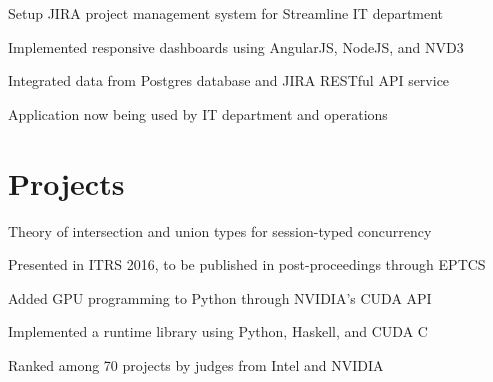 \documentclass[letterpaper]{deedy-resume} %
\begin{document}
\begin{minipage}[t]{0.66\textwidth}
\sectionspace %



\begin{tightitemize}
\item Setup JIRA project management system for Streamline IT department
\item Implemented responsive dashboards using AngularJS, NodeJS, and NVD3
\item Integrated data from Postgres database and JIRA RESTful API service 
\item Application now being used by IT department and operations
\end{tightitemize}

\sectionspace %


\section{Projects}


\begin{tightitemize}
\item Theory of intersection and union types for session-typed concurrency
\item Presented in ITRS 2016, to be published in post-proceedings through EPTCS
\end{tightitemize}

\sectionspace %



\begin{tightitemize}
\item Added GPU programming to Python through NVIDIA's CUDA API
\item Implemented a runtime library using Python, Haskell, and CUDA C
\item Ranked  among 70 projects by judges from Intel and NVIDIA
\end{tightitemize}


\end{minipage}
\end{document}
